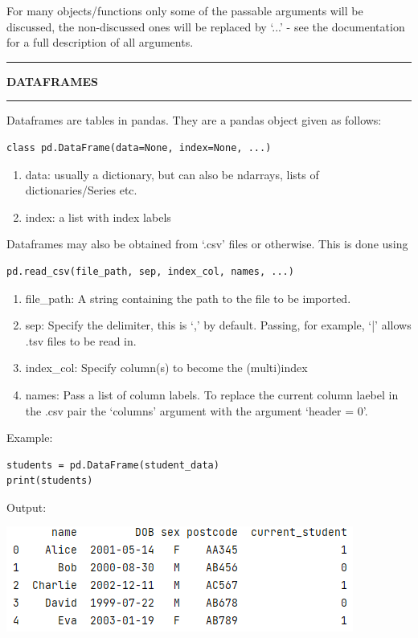 \documentclass[8pt]{extarticle}
\newcommand{\heading}[1]{%
    \noindent
    \rule{\linewidth}{0.4pt}
    \begin{center}
        \vspace{-1ex}
        \textbf{#1}        
        \vspace{-2.5ex}
    \end{center}
    \rule{\linewidth}{0.4pt}
}
\begin{document}
\begin{multicols}{4}
\begin{tcolorbox}[width=\columnwidth, colback=white!95!black] 
For many objects/functions only some of the passable arguments will be discussed, the non-discussed ones will be replaced by `...' - see the documentation for a full description of all arguments.
\end{tcolorbox}

\heading{DATAFRAMES}

Dataframes are tables in pandas. They are a pandas object given as follows:

\begin{lstlisting}[style=Python]
class pd.DataFrame(data=None, index=None, ...)
\end{lstlisting}

\begin{enumerate}
    \item data: usually a dictionary, but can also be ndarrays, lists of dictionaries/Series etc.
    \item index: a list with index labels   
\end{enumerate}

Dataframes may also be obtained from `.csv' files or otherwise. This is done using 

\begin{lstlisting}[style=Python]
pd.read_csv(file_path, sep, index_col, names, ...)
\end{lstlisting}

\begin{enumerate}
    \item file\_path: A string containing the path to the file to be imported.
    \item sep: Specify the delimiter, this is `,' by default. Passing, for example, `|' allows .tsv files to be read in.
    \item index\_col: Specify column(s) to become the (multi)index
    \item names: Pass a list of column labels. To replace the current column laebel in the .csv pair the `columns' argument with the argument `header = 0'.
\end{enumerate}

Example:
\begin{lstlisting}[style=Python]
students = pd.DataFrame(student_data)
print(students)
\end{lstlisting}

Output:
\begin{center}
\includegraphics[scale = 0.5]{images/mock_df.png}
\end{center}


\end{multicols}
\end{document}
